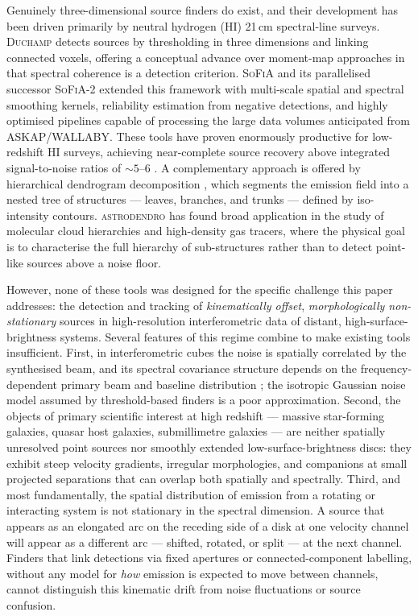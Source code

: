 Genuinely three-dimensional source finders do exist, and their development has been driven primarily by neutral hydrogen (HI) 21\,cm spectral-line surveys. \textsc{Duchamp} \citep{Whiting2012} detects sources by thresholding in three dimensions and linking connected voxels, offering a conceptual advance over moment-map approaches in that spectral coherence is a detection criterion. \textsc{SoFiA} \citep{Serra2015} and its parallelised successor \textsc{SoFiA-2} \citep{Westmeier2021} extended this framework with multi-scale spatial and spectral smoothing kernels, reliability estimation from negative detections, and highly optimised pipelines capable of processing the large data volumes anticipated from ASKAP/WALLABY. These tools have proven enormously productive for low-redshift HI surveys, achieving near-complete source recovery above integrated signal-to-noise ratios of $\sim5$--6 \citep{Westmeier2021}. A complementary approach is offered by hierarchical dendrogram decomposition \citep[as implemented in \textsc{astrodendro};][]{Rosolowsky2008}, which segments the emission field into a nested tree of structures --- leaves, branches, and trunks --- defined by iso-intensity contours. \textsc{astrodendro} has found broad application in the study of molecular cloud hierarchies and high-density gas tracers, where the physical goal is to characterise the full hierarchy of sub-structures rather than to detect point-like sources above a noise floor.

However, none of these tools was designed for the specific challenge this paper addresses: the detection and tracking of \emph{kinematically offset}, \emph{morphologically non-stationary} sources in high-resolution interferometric data of distant, high-surface-brightness systems. Several features of this regime combine to make existing tools insufficient. First, in interferometric cubes the noise is spatially correlated by the synthesised beam, and its spectral covariance structure depends on the frequency-dependent primary beam and baseline distribution \citep{Loomis2018}; the isotropic Gaussian noise model assumed by threshold-based finders is a poor approximation. Second, the objects of primary scientific interest at high redshift --- massive star-forming galaxies, quasar host galaxies, submillimetre galaxies --- are neither spatially unresolved point sources nor smoothly extended low-surface-brightness discs: they exhibit steep velocity gradients, irregular morphologies, and companions at small projected separations that can overlap both spatially and spectrally. Third, and most fundamentally, the spatial distribution of emission from a rotating or interacting system is not stationary in the spectral dimension. A source that appears as an elongated arc on the receding side of a disk at one velocity channel will appear as a different arc --- shifted, rotated, or split --- at the next channel. Finders that link detections via fixed apertures or connected-component labelling, without any model for \emph{how} emission is expected to move between channels, cannot distinguish this kinematic drift from noise fluctuations or source confusion.

